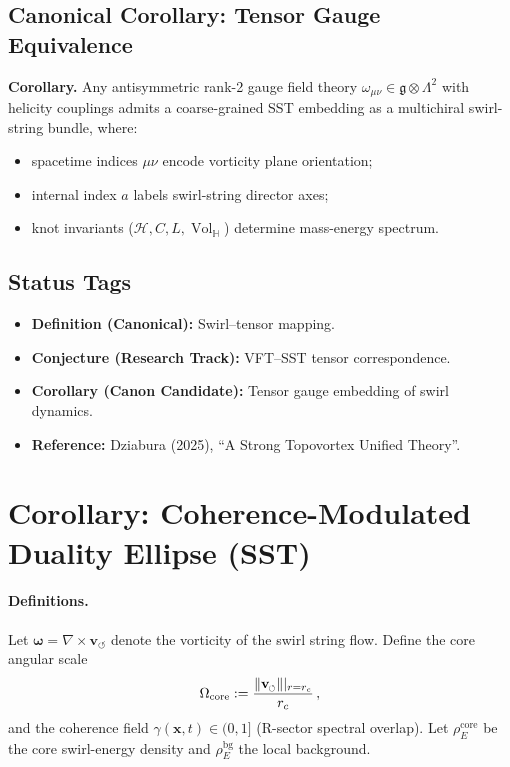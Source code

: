 \documentclass[10pt,reprint,aps,onecolumn,nofootinbib]{revtex4-2}
\newcommand{\vswirl}{\mathbf{v}_{\!\boldsymbol{\circlearrowleft}}}
\newcommand{\vnorm}{\lVert \mathbf{v}_{\mkern-2mu\scriptscriptstyle\boldsymbol{\circlearrowleft}} \rVert}               %
\newcommand{\rhoE}{\rho_{\!E}}                           %
\newcommand{\rc}{r_c}                                    %
\newcommand{\omegaVec}{\boldsymbol{\omega}}
\newcommand{\OmegaCore}{\Omega_{\mathrm{core}}}
\newcommand{\bg}{\mathrm{bg}}
\newcommand{\core}{\mathrm{core}}
\newcommand{\Vol}{\operatorname{Vol}}   %
\begin{document}
\subsection*{Canonical Corollary: Tensor Gauge Equivalence}

    \textbf{Corollary.} Any antisymmetric rank-2 gauge field theory $\omega_{\mu\nu} \in \mathfrak{g} \otimes \Lambda^2$ with helicity couplings admits a coarse-grained SST embedding as a multichiral swirl-string bundle, where:
    \begin{itemize}
        \item spacetime indices $\mu\nu$ encode vorticity plane orientation;
        \item internal index $a$ labels swirl-string director axes;
        \item knot invariants ($\mathcal{H}, C, L, \Vol_{\!\mathbb{H}}$) determine mass-energy spectrum.
    \end{itemize}

\subsection*{Status Tags}

    \begin{itemize}
        \item \textbf{Definition (Canonical):} Swirl–tensor mapping.
        \item \textbf{Conjecture (Research Track):} VFT–SST tensor correspondence.
        \item \textbf{Corollary (Canon Candidate):} Tensor gauge embedding of swirl dynamics.
        \item \textbf{Reference:} Dziabura (2025), “A Strong Topovortex Unified Theory”.
    \end{itemize}



\section{Corollary: Coherence-Modulated Duality Ellipse (SST)}
\label{sec:duality-ellipse-sst}

\paragraph{Definitions.}
    Let $\omegaVec=\nabla\times\vswirl$ denote the vorticity of the swirl string flow.
    Define the core angular scale
    \begin{equation}
        \OmegaCore := \frac{\vnorm|_{r=\rc}}{\rc}\,,
    \end{equation}
    and the coherence field $\gamma(\mathbf x,t)\in(0,1]$ (R-sector spectral overlap).
    Let $\rhoE^{\core}$ be the core swirl-energy density and $\rhoE^{\bg}$ the local background.
\end{document}
